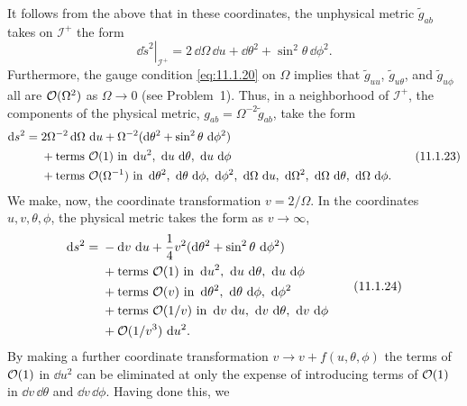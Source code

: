 It follows from the above that in these coordinates, the unphysical metric
\(\tilde g_{ab}\) takes on \(\mathcal I^+\) the form
\begin{equation}
  \left.\dd\tilde{s}^2\right|_{\mathcal I^+}
  =2\,\dd\Omega\,\dd u+\dd\theta^2+\sin^2\theta\,\dd\phi^2.
  \tag{11.1.22}\label{eq:11.1.22}
\end{equation}
Furthermore, the gauge condition \eqref{eq:11.1.20} on \(\Omega\) implies that
\(\tilde g_{uu}\), \(\tilde g_{u\theta}\), and \(\tilde g_{u\phi}\) all are
\(\mathcal{O}(\Omega^2)\) as \(\Omega\to0\) (see Problem~1). Thus, in a neighborhood of
\(\mathcal I^+\), the components of the physical metric,
\(g_{ab}=\Omega^{-2}\tilde g_{ab}\), take the form
\begin{equation}
  \begin{aligned}
  \dd s^2={}&2\Omega^{-2}\dd\Omega\,\dd u
  +\Omega^{-2}(\dd\theta^2+\sin^2\theta\,\dd\phi^2)\\
  &+\text{terms }\order(1)\text{ in }\dd u^2,\ \dd u\,\dd\theta,\ \dd u\,\dd\phi\\
  &+\text{terms }\order(\Omega^{-1})\text{ in }\dd\theta^2,\ \dd\theta\,\dd\phi,\
  \dd\phi^2,\ \dd\Omega\,\dd u,\ \dd\Omega^2,\ \dd\Omega\,\dd\theta,\ \dd\Omega\,\dd\phi.
  \end{aligned}
  \tag{11.1.23}\label{eq:11.1.23}
\end{equation}
We make, now, the coordinate transformation \(v=2/\Omega\). In the coordinates
\(u,v,\theta,\phi\), the physical metric takes the form as \(v\to\infty\),
\begin{equation}
  \begin{aligned}
  \dd s^2={}&-\dd v\,\dd u+\frac14v^2(\dd\theta^2+\sin^2\theta\,\dd\phi^2)\\
  &+\text{terms }\order(1)\text{ in }\dd u^2,\ \dd u\,\dd\theta,\ \dd u\,\dd\phi\\
  &+\text{terms }\order(v)\text{ in }\dd\theta^2,\ \dd\theta\,\dd\phi,\ \dd\phi^2\\
  &+\text{terms }\order(1/v)\text{ in }\dd v\,\dd u,\ \dd v\,\dd\theta,\ \dd v\,\dd\phi\\
  &+\order(1/v^3)\,\dd u^2.
  \end{aligned}
  \tag{11.1.24}\label{eq:11.1.24}
\end{equation}
By making a further coordinate transformation \(v\to v+f(u,\theta,\phi)\) the terms
of \(\mathcal{O}(1)\) in \(\dd u^2\) can be eliminated at only the expense of introducing
terms of \(\mathcal{O}(1)\) in \(\dd v\,\dd\theta\) and \(\dd v\,\dd\phi\). Having done this, we
